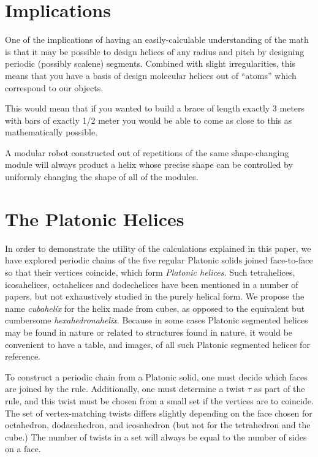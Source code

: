 \documentclass[11pt]{article}
\begin{document}
{\section{Implications}

One of the implications of having an easily-calculable understanding of the math
is that it may be possible to design helices
of any radius and pitch by designing periodic (possibly scalene) segments. Combined with slight
irregularities, this means that you have a basis of design molecular helices
out of ``atoms'' which correspond to our objects.

This would mean that if you wanted to build a brace of length exactly 3 meters
with bars of exactly 1/2 meter you would be able to come as close to this
as mathematically possible.

A modular robot constructed out of repetitions of the same shape-changing module will always product a helix
whose precise shape can be controlled by uniformly changing the shape of all of the modules.

\section{The Platonic Helices}

\label{sec:platonic}

In order to demonstrate the utility of the calculations explained in this paper, we have explored
periodic chains of the five regular Platonic solids joined face-to-face so that their vertices coincide,
which form {\em Platonic helices.}
Such tetrahelices, icosahelices, octahelices and dodechelices
have been mentioned in a number of papers\cite{elgersma2016quadrahelix,babiker2012combinatorial,lord2001sphere}, but not exhaustively studied in
the purely helical form.
We propose the name {\em cubahelix} for the helix made from cubes, as opposed to the equivalent
but cumbersome {\em hexahedronahelix}.
Because in some cases Platonic segmented helices may be found in nature or
related to structures found in nature\cite{lord2004gamma,pearce1990structure},
it would be convenient to have a table, and images, of all such Platonic segmented helices for reference.

To construct a periodic chain from a Platonic solid, one must decide which faces are joined by the rule.
Additionally, one must determine a twist
$\tau$ as part of the rule, and this twist must be chosen from a small set if the vertices are to coincide.
The set of vertex-matching twists differs slightly depending on the face chosen for octahedron, dodacahedron, and icosahedron
(but not for the tetrahedron and the cube.) The number of twists in a set will always be equal to the number of sides on a face.

}
\end{document}

